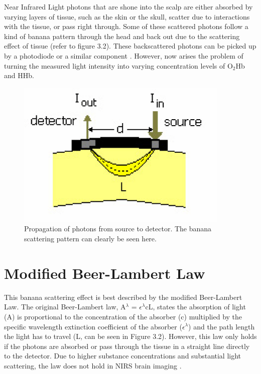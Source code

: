 
Near Infrared Light photons that are shone into the scalp are either absorbed by varying layers of tissue, such as the skin or the skull, scatter due to interactions with the tissue, or pass right through. Some of these scattered photons follow a kind of banana pattern through the head and back out due to the scattering effect of tissue (refer to figure 3.2). These backscattered photons can be picked up by a photodiode or a similar component \cite{rosen05}. However, now arises the problem of turning the measured light intensity into varying concentration levels of O$_{2}$Hb and HHb.

\begin{figure}[htp]
\centering
\includegraphics[width=4in]{banana.jpg}
\caption[Propagation of photons]{Propagation of photons from source to detector. The banana scattering pattern can clearly be seen here. \cite{rosen05}}
\end{figure}

\section {Modified Beer-Lambert Law}

This banana scattering effect is best described by the modified Beer-Lambert Law. The original Beer-Lambert law, A$^\lambda$ = $\epsilon^\lambda$cL, states the absorption of light (A) is proportional to the concentration of the absorber (c) multiplied by the specific wavelength extinction coefficient of the absorber ($\epsilon^\lambda$) and the path length the light has to travel (L, can be seen in Figure 3.2). However, this law only holds if the photons are absorbed or pass through the tissue in a straight line directly to the detector. Due to higher substance concentrations and substantial light scattering, the law does not hold in NIRS brain imaging \cite{chance97}. 

